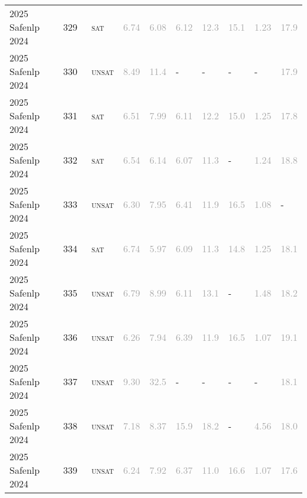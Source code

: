 \begin{center}
{\begin{longtable}{@{}llllllllll@{}}
2025 Safenlp 2024 & 329 & ~\textsc{sat} & \textcolor{darkgray}{6.74} & \textcolor{darkgray}{6.08} & \textcolor{darkgray}{6.12} & \textcolor{darkgray}{12.3} & \textcolor{darkgray}{15.1} & \textcolor{darkgray}{1.23} & \textcolor{darkgray}{17.9} \\
2025 Safenlp 2024 & 330 & ~\textsc{unsat} & \textcolor{darkgray}{8.49} & \textcolor{darkgray}{11.4} & - & - & - & - & \textcolor{darkgray}{17.9} \\
2025 Safenlp 2024 & 331 & ~\textsc{sat} & \textcolor{darkgray}{6.51} & \textcolor{darkgray}{7.99} & \textcolor{darkgray}{6.11} & \textcolor{darkgray}{12.2} & \textcolor{darkgray}{15.0} & \textcolor{darkgray}{1.25} & \textcolor{darkgray}{17.8} \\
2025 Safenlp 2024 & 332 & ~\textsc{sat} & \textcolor{darkgray}{6.54} & \textcolor{darkgray}{6.14} & \textcolor{darkgray}{6.07} & \textcolor{darkgray}{11.3} & - & \textcolor{darkgray}{1.24} & \textcolor{darkgray}{18.8} \\
2025 Safenlp 2024 & 333 & ~\textsc{unsat} & \textcolor{darkgray}{6.30} & \textcolor{darkgray}{7.95} & \textcolor{darkgray}{6.41} & \textcolor{darkgray}{11.9} & \textcolor{darkgray}{16.5} & \textcolor{darkgray}{1.08} & - \\
2025 Safenlp 2024 & 334 & ~\textsc{sat} & \textcolor{darkgray}{6.74} & \textcolor{darkgray}{5.97} & \textcolor{darkgray}{6.09} & \textcolor{darkgray}{11.3} & \textcolor{darkgray}{14.8} & \textcolor{darkgray}{1.25} & \textcolor{darkgray}{18.1} \\
2025 Safenlp 2024 & 335 & ~\textsc{unsat} & \textcolor{darkgray}{6.79} & \textcolor{darkgray}{8.99} & \textcolor{darkgray}{6.11} & \textcolor{darkgray}{13.1} & - & \textcolor{darkgray}{1.48} & \textcolor{darkgray}{18.2} \\
2025 Safenlp 2024 & 336 & ~\textsc{unsat} & \textcolor{darkgray}{6.26} & \textcolor{darkgray}{7.94} & \textcolor{darkgray}{6.39} & \textcolor{darkgray}{11.9} & \textcolor{darkgray}{16.5} & \textcolor{darkgray}{1.07} & \textcolor{darkgray}{19.1} \\
2025 Safenlp 2024 & 337 & ~\textsc{unsat} & \textcolor{darkgray}{9.30} & \textcolor{darkgray}{32.5} & - & - & - & - & \textcolor{darkgray}{18.1} \\
2025 Safenlp 2024 & 338 & ~\textsc{unsat} & \textcolor{darkgray}{7.18} & \textcolor{darkgray}{8.37} & \textcolor{darkgray}{15.9} & \textcolor{darkgray}{18.2} & - & \textcolor{darkgray}{4.56} & \textcolor{darkgray}{18.0} \\
2025 Safenlp 2024 & 339 & ~\textsc{unsat} & \textcolor{darkgray}{6.24} & \textcolor{darkgray}{7.92} & \textcolor{darkgray}{6.37} & \textcolor{darkgray}{11.0} & \textcolor{darkgray}{16.6} & \textcolor{darkgray}{1.07} & \textcolor{darkgray}{17.6} \\

\end{longtable}}
\end{center}
